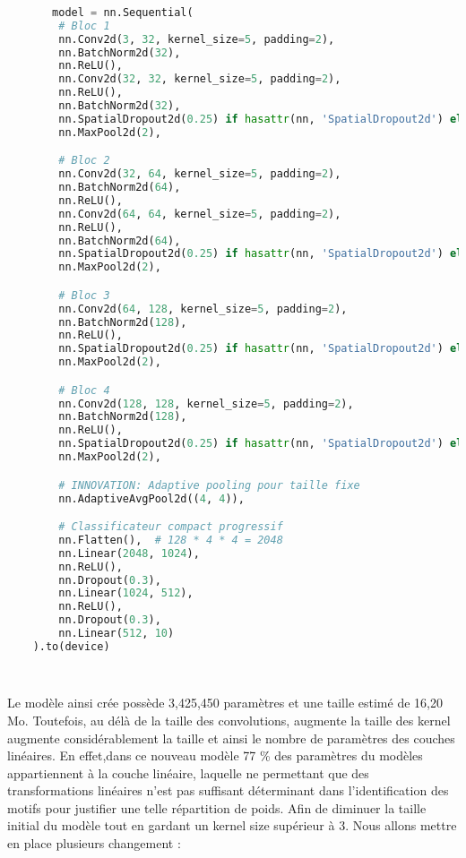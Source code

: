 \documentclass[12pt,a4paper]{article}
\begin{document}
\begin{lstlisting}[language = python]
    
       model = nn.Sequential(
        # Bloc 1
        nn.Conv2d(3, 32, kernel_size=5, padding=2),
        nn.BatchNorm2d(32),
        nn.ReLU(),
        nn.Conv2d(32, 32, kernel_size=5, padding=2),
        nn.ReLU(),
        nn.BatchNorm2d(32),
        nn.SpatialDropout2d(0.25) if hasattr(nn, 'SpatialDropout2d') else nn.Dropout2d(0.25),
        nn.MaxPool2d(2),

        # Bloc 2
        nn.Conv2d(32, 64, kernel_size=5, padding=2),
        nn.BatchNorm2d(64),
        nn.ReLU(),
        nn.Conv2d(64, 64, kernel_size=5, padding=2),
        nn.ReLU(),
        nn.BatchNorm2d(64),
        nn.SpatialDropout2d(0.25) if hasattr(nn, 'SpatialDropout2d') else nn.Dropout2d(0.25),
        nn.MaxPool2d(2),

        # Bloc 3
        nn.Conv2d(64, 128, kernel_size=5, padding=2),
        nn.BatchNorm2d(128),
        nn.ReLU(),
        nn.SpatialDropout2d(0.25) if hasattr(nn, 'SpatialDropout2d') else nn.Dropout2d(0.25),
        nn.MaxPool2d(2),

        # Bloc 4
        nn.Conv2d(128, 128, kernel_size=5, padding=2),
        nn.BatchNorm2d(128),
        nn.ReLU(),
        nn.SpatialDropout2d(0.25) if hasattr(nn, 'SpatialDropout2d') else nn.Dropout2d(0.25),
        nn.MaxPool2d(2),

        # INNOVATION: Adaptive pooling pour taille fixe
        nn.AdaptiveAvgPool2d((4, 4)),

        # Classificateur compact progressif
        nn.Flatten(),  # 128 * 4 * 4 = 2048
        nn.Linear(2048, 1024),
        nn.ReLU(),
        nn.Dropout(0.3),
        nn.Linear(1024, 512),
        nn.ReLU(),
        nn.Dropout(0.3),
        nn.Linear(512, 10)
    ).to(device)

    
\end{lstlisting}
Le modèle ainsi crée possède 3,425,450 paramètres et une taille estimé de 16,20 Mo. 
Toutefois, au délà de la taille des convolutions, augmente la taille des kernel augmente considérablement la taille et ainsi le nombre de paramètres des couches linéaires. 
En effet,dans ce nouveau modèle 77 \% des paramètres du modèles appartiennent à la couche linéaire, laquelle ne permettant que des transformations linéaires n'est pas suffisant déterminant dans l'identification des motifs pour justifier une telle répartition de poids. 
Afin de diminuer la taille initial du modèle tout en gardant un kernel size supérieur à 3. Nous allons mettre en place plusieurs changement : 
\end{document}
